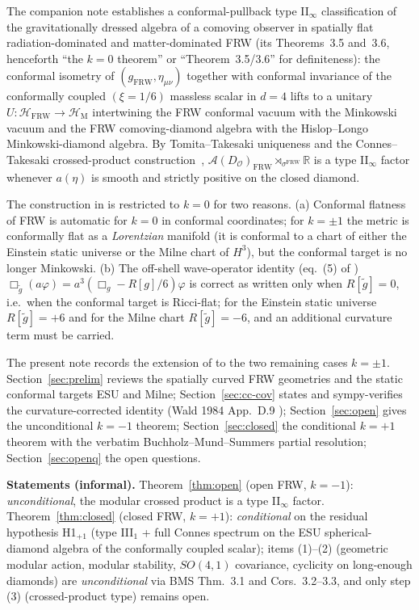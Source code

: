 \documentclass[11pt]{article}
\theoremstyle{definition}
\newcommand{\R}{\mathbb{R}}
\newcommand{\HH}{\mathcal{H}}
\renewcommand{\AA}{\mathcal{A}}
\newcommand{\OO}{\mathcal{O}}
\newcommand{\FRW}{\mathrm{FRW}}
\newcommand{\Mink}{\mathrm{M}}
\begin{document}
The companion note \cite{Remondiere2026} establishes a conformal-pullback
type II$_\infty$ classification of the gravitationally dressed algebra of a
comoving observer in spatially flat radiation-dominated and matter-dominated
FRW (its Theorems~3.5 and~3.6, henceforth ``the $k=0$ theorem'' or
``Theorem~3.5/3.6'' for definiteness): the conformal isometry of $(g_\FRW,
\eta_{\mu\nu})$ together with conformal invariance of the conformally
coupled $(\xi=1/6)$ massless scalar in $d=4$ lifts to a unitary
$U:\HH_\FRW\to\HH_\Mink$ intertwining the FRW conformal vacuum with the
Minkowski vacuum and the FRW comoving-diamond algebra with the
Hislop--Longo~\cite{HislopLongo1982} Minkowski-diamond algebra. By
Tomita--Takesaki uniqueness and the Connes--Takesaki crossed-product
construction~\cite{Connes1973, CLPW2023}, $\AA(D_\OO)_\FRW
\rtimes_{\sigma^\FRW}\R$ is a type II$_\infty$ factor whenever $a(\eta)$ is
smooth and strictly positive on the closed diamond.

The construction in \cite{Remondiere2026} is restricted to $k=0$ for two
reasons. (a) Conformal flatness of FRW is automatic for $k=0$ in conformal
coordinates; for $k=\pm 1$ the metric is conformally flat as a
\emph{Lorentzian} manifold (it is conformal to a chart of either the
Einstein static universe or the Milne chart of $H^3$), but the conformal
target is no longer Minkowski. (b) The off-shell wave-operator identity
(eq.~(5) of \cite{Remondiere2026})
\(
\Box_{\tilde g}(a\varphi) = a^3(\Box_g - R[g]/6)\varphi
\)
is correct as written only when $R[\tilde g]=0$, i.e.\ when the conformal
target is Ricci-flat; for the Einstein static universe $R[\tilde g]=+6$ and
for the Milne chart $R[\tilde g]=-6$, and an additional curvature term
must be carried.

The present note records the extension of \cite{Remondiere2026} to the two
remaining cases $k=\pm 1$. Section~\ref{sec:prelim} reviews the spatially
curved FRW geometries and the static conformal targets ESU and Milne;
Section~\ref{sec:cc-cov} states and sympy-verifies the curvature-corrected
identity (Wald 1984 App.~D.9 \cite{Wald1984}); Section~\ref{sec:open}
gives the unconditional $k=-1$ theorem; Section~\ref{sec:closed} the
conditional $k=+1$ theorem with the verbatim Buchholz--Mund--Summers
\cite{BMS2000} partial resolution; Section~\ref{sec:openq} the open
questions.

\medskip

\noindent\textbf{Statements (informal).} Theorem~\ref{thm:open} (open FRW,
$k=-1$): \emph{unconditional}, the modular crossed product is a type
II$_\infty$ factor. Theorem~\ref{thm:closed} (closed FRW, $k=+1$):
\emph{conditional} on the residual hypothesis H1$_{+1}$ (type III$_1$ +
full Connes spectrum on the ESU spherical-diamond algebra of the conformally
coupled scalar); items (1)--(2) (geometric modular action, modular
stability, $SO(4,1)$ covariance, cyclicity on long-enough diamonds) are
\emph{unconditional} via BMS \cite{BMS2000} Thm.~3.1 and Cors.~3.2--3.3,
and only step (3) (crossed-product type) remains open.
\end{document}
